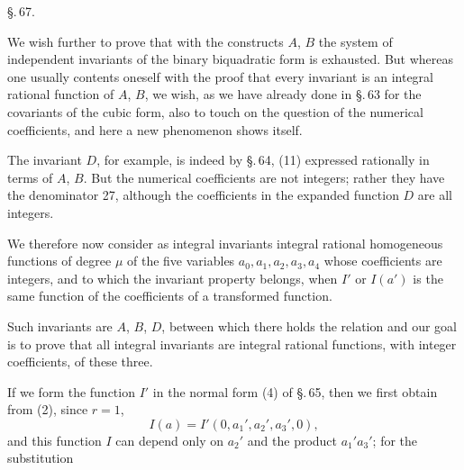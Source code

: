 \begin{center}
\S.\,67.

\end{center}

We wish further to prove that with the constructs $A$, $B$ the system of
independent invariants of the binary biquadratic form is exhausted.
But whereas one usually contents oneself with the proof that every
invariant is an integral rational function of $A$, $B$, we wish, as we
have already done in \S.\,63 for the covariants of the cubic form, also
to touch on the question of the numerical coefficients, and here a new
phenomenon shows itself.

The invariant $D$, for example, is indeed by \S.\,64, (11) expressed rationally
in terms of $A$, $B$. But the numerical coefficients are not integers; rather
they have the denominator 27, although the coefficients in the expanded function
$D$ are all integers.

We therefore now consider as integral invariants integral rational homogeneous
functions of degree $\mu$ of the five variables $a_0, a_1, a_2, a_3, a_4$
whose coefficients are integers, and to which the invariant property
belongs, when $I'$ or $I(a')$ is the same function of the coefficients of a
transformed function.

Such invariants are $A$, $B$, $D$, between which there holds the relation
and our goal is to prove that all integral invariants are integral rational
functions, with integer coefficients, of these three.

If we form the function $I'$ in the normal form (4) of \S.\,65, then
we first obtain from (2), since $r = 1$,
\[
I(a) = I'(0, a_1', a_2', a_3', 0),
\]
and this function $I$ can depend only on $a_2'$ and the product $a_1'a_3'$;
for the substitution
